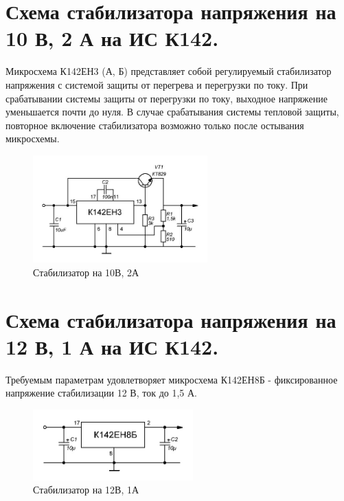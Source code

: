 \documentclass[unicode, 12pt, a4paper, oneside]{article}
\begin{document}
\section{Схема стабилизатора напряжения на 10 В, 2 А на ИС К142.}

Микросхема К142ЕН3 (А, Б) представляет собой регулируемый стабилизатор напряжения с системой защиты от перегрева и перегрузки по току. При срабатывании системы защиты от перегрузки по току, выходное напряжение уменьшается почти до нуля. В случае срабатывания системы тепловой защиты, повторное включение стабилизатора возможно только после остывания микросхемы.

\begin{figure}[H]
\centering
\includegraphics[width=0.6\textwidth]{147.jpg}
\caption{Стабилизатор на 10В, 2А}
\end{figure}

\section{Схема стабилизатора напряжения на 12 В, 1 А на ИС К142.}

Требуемым параметрам удовлетворяет микросхема К142ЕН8Б - фиксированное напряжение стабилизации 12 В, ток до 1,5 А.
\begin{figure}[H]
\centering
\includegraphics[width=0.55\textwidth]{148.jpg}
\caption{Стабилизатор на 12В, 1А}
\end{figure}

\end{document}
